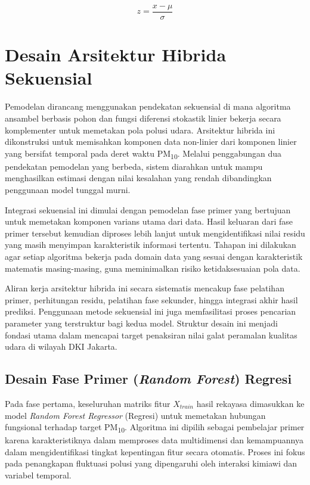 \begin{equation}
z = \frac{x - \mu}{\sigma}
\label{eq:standardization}
\end{equation}

\section{Desain Arsitektur Hibrida Sekuensial}

Pemodelan dirancang menggunakan pendekatan sekuensial di mana algoritma ansambel berbasis pohon dan fungsi diferensi stokastik linier bekerja secara komplementer untuk memetakan pola polusi udara. Arsitektur hibrida ini dikonstruksi untuk memisahkan komponen data non-linier dari komponen linier yang bersifat temporal pada deret waktu PM\textsubscript{10}. Melalui penggabungan dua pendekatan pemodelan yang berbeda, sistem diarahkan untuk mampu menghasilkan estimasi dengan nilai kesalahan yang rendah dibandingkan penggunaan model tunggal murni.

Integrasi sekuensial ini dimulai dengan pemodelan fase primer yang bertujuan untuk memetakan komponen varians utama dari data. Hasil keluaran dari fase primer tersebut kemudian diproses lebih lanjut untuk mengidentifikasi nilai residu yang masih menyimpan karakteristik informasi tertentu. Tahapan ini dilakukan agar setiap algoritma bekerja pada domain data yang sesuai dengan karakteristik matematis masing-masing, guna meminimalkan risiko ketidaksesuaian pola data.

Aliran kerja arsitektur hibrida ini secara sistematis mencakup fase pelatihan primer, perhitungan residu, pelatihan fase sekunder, hingga integrasi akhir hasil prediksi. Penggunaan metode sekuensial ini juga memfasilitasi proses pencarian parameter yang terstruktur bagi kedua model. Struktur desain ini menjadi fondasi utama dalam mencapai target penaksiran nilai galat peramalan kualitas udara di wilayah DKI Jakarta.

\subsection{Desain Fase Primer (\textit{Random Forest}) Regresi}

Pada fase pertama, keseluruhan matriks fitur $X_{train}$ hasil rekayasa dimasukkan ke model \textit{Random Forest Regressor} (Regresi) untuk memetakan hubungan fungsional terhadap target PM\textsubscript{10}. Algoritma ini dipilih sebagai pembelajar primer karena karakteristiknya dalam memproses data multidimensi dan kemampuannya dalam mengidentifikasi tingkat kepentingan fitur secara otomatis. Proses ini fokus pada penangkapan fluktuasi polusi yang dipengaruhi oleh interaksi kimiawi dan variabel temporal.

